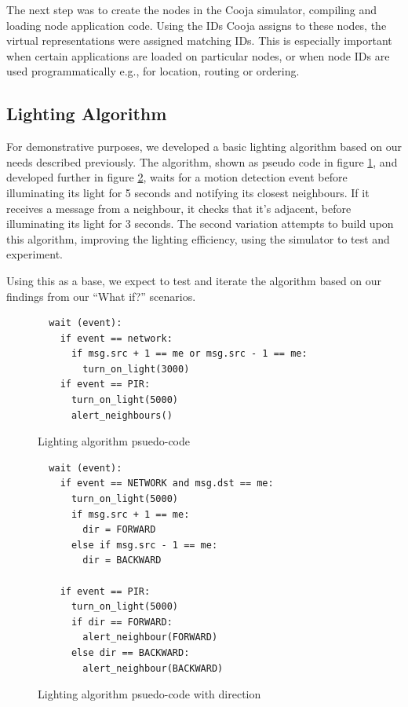 The next step was to create the nodes in the Cooja simulator, compiling and loading node application code. Using the IDs Cooja assigns to these nodes, the virtual representations were assigned matching IDs. This is especially important when certain applications are loaded on particular nodes, or when node IDs are used programmatically e.g., for location, routing or ordering.

\subsection{Lighting Algorithm}
\label{sub:Lighting Algorithm}
For demonstrative purposes, we developed a basic lighting algorithm based on our needs described previously. The algorithm, shown as pseudo code in figure \ref{fig:algorithm}, and developed further in figure \ref{fig:algorithm2}, waits for a motion detection event before illuminating its light for 5 seconds and notifying its closest neighbours. If it receives a message from a neighbour, it checks that it's adjacent, before illuminating its light for 3 seconds. The second variation attempts to build upon this algorithm, improving the lighting efficiency, using the simulator to test and experiment.

Using this as a base, we expect to test and iterate the algorithm based on our findings from our ``What if?'' scenarios.
\begin{figure}
\begin{verbatim}
  wait (event):
    if event == network:
      if msg.src + 1 == me or msg.src - 1 == me:
        turn_on_light(3000)
    if event == PIR:
      turn_on_light(5000)
      alert_neighbours()
\end{verbatim}
\caption{Lighting algorithm psuedo-code}
\label{fig:algorithm}
\end{figure}
\begin{figure}
\begin{verbatim}
  wait (event):
    if event == NETWORK and msg.dst == me:
      turn_on_light(5000)
      if msg.src + 1 == me:
        dir = FORWARD
      else if msg.src - 1 == me:
        dir = BACKWARD

    if event == PIR:
      turn_on_light(5000)
      if dir == FORWARD:
        alert_neighbour(FORWARD)
      else dir == BACKWARD:
        alert_neighbour(BACKWARD)
\end{verbatim}
\caption{Lighting algorithm psuedo-code with direction}
\label{fig:algorithm2}
\end{figure}



